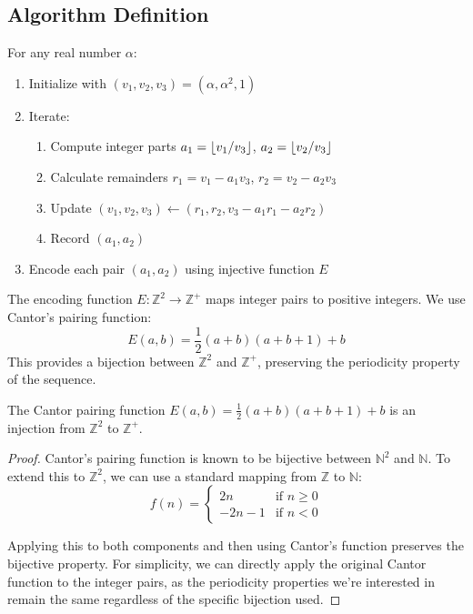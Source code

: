 \subsection{Algorithm Definition}

\begin{algorithm_def}
For any real number $\alpha$:
\begin{enumerate}
    \item Initialize with $(v_1, v_2, v_3) = (\alpha, \alpha^2, 1)$
    \item Iterate:
    \begin{enumerate}
        \item Compute integer parts $a_1 = \lfloor v_1/v_3 \rfloor$, $a_2 = \lfloor v_2/v_3 \rfloor$
        \item Calculate remainders $r_1 = v_1 - a_1v_3$, $r_2 = v_2 - a_2v_3$
        \item Update $(v_1, v_2, v_3) \leftarrow (r_1, r_2, v_3 - a_1r_1 - a_2r_2)$
        \item Record $(a_1, a_2)$
    \end{enumerate}
    \item Encode each pair $(a_1, a_2)$ using injective function $E$
\end{enumerate}
\end{algorithm_def}

\begin{definition}
The encoding function $E: \mathbb{Z}^2 \to \mathbb{Z}^+$ maps integer pairs to positive integers. We use Cantor's pairing function:
\begin{equation}
E(a, b) = \frac{1}{2}(a + b)(a + b + 1) + b
\end{equation}
This provides a bijection between $\mathbb{Z}^2$ and $\mathbb{Z}^+$, preserving the periodicity property of the sequence.
\end{definition}

\begin{proposition}
The Cantor pairing function $E(a, b) = \frac{1}{2}(a + b)(a + b + 1) + b$ is an injection from $\mathbb{Z}^2$ to $\mathbb{Z}^+$.
\end{proposition}

\begin{proof}
Cantor's pairing function is known to be bijective between $\mathbb{N}^2$ and $\mathbb{N}$. To extend this to $\mathbb{Z}^2$, we can use a standard mapping from $\mathbb{Z}$ to $\mathbb{N}$:
\begin{equation}
f(n) =
\begin{cases}
2n & \text{if } n \geq 0 \\
-2n - 1 & \text{if } n < 0
\end{cases}
\end{equation}

Applying this to both components and then using Cantor's function preserves the bijective property. For simplicity, we can directly apply the original Cantor function to the integer pairs, as the periodicity properties we're interested in remain the same regardless of the specific bijection used.
\end{proof}

